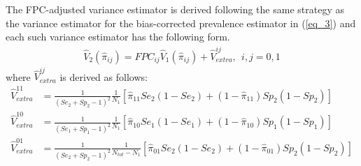 \documentclass[useAMS,usenatbib,referee]{biom}
\begin{document}
The FPC-adjusted variance estimator is derived following the same strategy as the variance estimator for the bias-corrected prevalence estimator in (\ref{eq_3}) \citep{Ge2023b} and each such variance estimator has the following form.  
\begin{align*}
    \hat{V}_2(\hat{\pi}_{ij}) = FPC_{ij}\hat{V}_1(\hat{\pi}_{ij}) + \hat{V}_{extra}^{ij}, ~~ i,j=0,1 
\end{align*}
where $\hat{V}_{extra}^{ij}$ is derived as follows:
\begin{align}
    \hat{V}_{extra}^{11} &= \frac{1}{(Se_2+Sp_2-1)^2}\frac{1}{N_{1}}[\hat{\pi}_{11} Se_2(1-Se_2)+(1-\hat{\pi}_{11})Sp_2(1-Sp_2)] \\
    \hat{V}_{extra}^{10} &= \frac{1}{(Se_1+Sp_1-1)^2}\frac{1}{N_{1}}[\hat{\pi}_{10} Se_1(1-Se_1)+(1-\hat{\pi}_{10})Sp_1(1-Sp_1)] \\
    \hat{V}_{extra}^{01} &= \frac{1}{(Se_2+Sp_2-1)^2}\frac{1}{N_{tot}-N_{1}}[\hat{\pi}_{01} Se_2(1-Se_2)+(1-\hat{\pi}_{01})Sp_2(1-Sp_2)] 
\end{align}

\label{lastpage}
\end{document}
